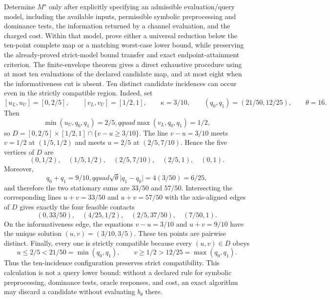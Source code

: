 Determine \(M^{\star}\) only after explicitly specifying an admissible evaluation/query model, including the available inputs, permissible symbolic preprocessing and dominance tests, the information returned by a channel evaluation, and the charged cost.  Within that model, prove either a universal reduction below the ten-point complete map or a matching worst-case lower bound, while preserving the already-proved strict-model bound transfer and exact endpoint-attainment criterion.
The finite-envelope theorem gives a direct exhaustive procedure using at most ten evaluations of the declared candidate map, and at most eight when the informativeness cut is absent.  Ten distinct candidate incidences can occur even in the strictly compatible region.  Indeed, set
\[
[u_L,u_U]=[0,2/5],\qquad [v_L,v_U]=[1/2,1],\qquad
\kappa=3/10,\qquad (q_0,q_1)=(21/50,12/25),\qquad \theta=16.
\]
Then
\[
\min(u_U,q_0,q_1)=2/5,qquad
\max(v_L,q_0,q_1)=1/2,
\]
so \(D=[0,2/5]\times[1/2,1]\cap\{v-u\geq3/10\}\).  The line \(v-u=3/10\) meets \(v=1/2\) at \((1/5,1/2)\) and meets \(u=2/5\) at \((2/5,7/10)\).  Hence the five vertices of \(D\) are
\[
(0,1/2),\quad(1/5,1/2),\quad(2/5,7/10),\quad(2/5,1),\quad(0,1).
\]
Moreover,
\[
q_0+q_1=9/10,qquad \sqrt{\theta}\lvert q_1-q_0\rvert
=4(3/50)=6/25,
\]
and therefore the two stationary sums are \(33/50\) and \(57/50\).  Intersecting the corresponding lines \(u+v=33/50\) and \(u+v=57/50\) with the axis-aligned edges of \(D\) gives exactly the four feasible contacts
\[
(0,33/50),\quad(4/25,1/2),\quad(2/5,37/50),\quad(7/50,1).
\]
On the informativeness edge, the equations \(v-u=3/10\) and \(u+v=9/10\) have the unique solution \((u,v)=(3/10,3/5)\).  These ten points are pairwise distinct.  Finally, every one is strictly compatible because every \((u,v)\in D\) obeys
\[
u\leq2/5<21/50=\min(q_0,q_1),
\qquad
v\geq1/2>12/25=\max(q_0,q_1).
\]
Thus the ten-incidence configuration preserves strict compatibility.  This calculation is not a query lower bound: without a declared rule for symbolic preprocessing, dominance tests, oracle responses, and cost, an exact algorithm may discard a candidate without evaluating \(b_{\theta}\) there.

